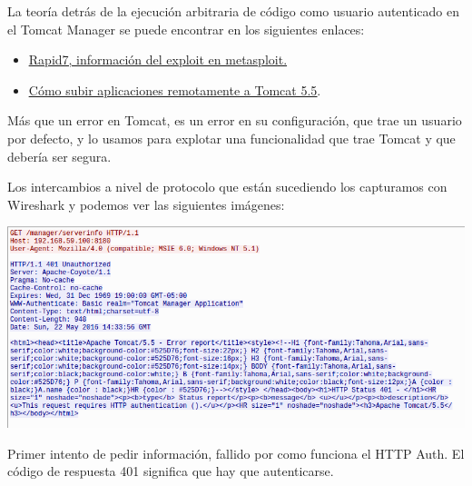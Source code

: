 \documentclass[a4paper,12pt]{scrartcl}
\begin{document}
La teoría detrás de la ejecución arbitraria de código como usuario autenticado en el Tomcat Manager se puede encontrar en los siguientes enlaces:

\begin{itemize}
	\item \hyperref{https://www.rapid7.com/db/modules/exploit/multi/http/tomcat_mgr_upload}{rapid7}{tomcat}{\underline{Rapid7, información del exploit en metasploit.}}
	\item \hyperref{http://tomcat.apache.org/tomcat-5.5-doc/manager-howto.html#Deploy_A_New_Application_Remotely}{tomcat}{uploadwar}{\underline{Cómo subir aplicaciones remotamente a Tomcat 5.5}}.
\end{itemize}

Más que un error en Tomcat, es un error en su configuración, que trae un usuario por defecto, y lo usamos para explotar una funcionalidad que trae Tomcat y que debería ser segura. 

\vspace{10pt}

Los intercambios a nivel de protocolo que están sucediendo los capturamos con Wireshark y podemos ver las siguientes imágenes:

\begin{center}
\includegraphics[width=1\linewidth]{cap1}

Primer intento de pedir información, fallido por como funciona el HTTP Auth. El código de respuesta 401 significa que hay que autenticarse.

\end{center}

\newpage
\end{document}
